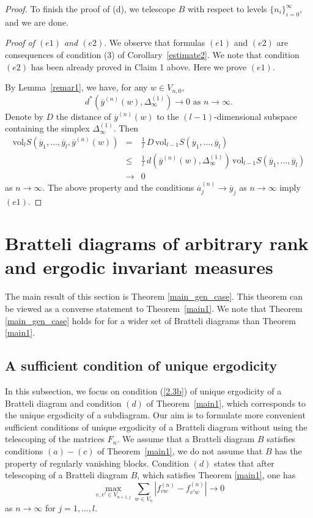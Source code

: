 \documentclass[11pt, english, reqno]{amsart}
\theoremstyle{definition}
\theoremstyle{remark}
\theoremstyle{plain}
\def\ov{\overline}
\numberwithin{equation}{section}
\begin{document}
{\begin{proof}
\medskip
To finish the proof of (d), we  telescope $B$ with respect to levels
$\{n_i\}_{i = 0}^{\infty}$, and we are done.
\medskip

\textit{Proof of  $(e1)$ and  $(e2)$}. We observe that formulas $(e1)$ and $(e2)$
are  consequences of
 condition (3) of Corollary~\ref{estimate2}. We note that condition $(e2)$
has  been already proved in Claim 1 above.
Here we prove $(e1)$.

By Lemma~\ref{remar1},  we have, for any $w \in V_{n,0}$,
$$
d^*(\ov y^{(n)}(w), \Delta_\infty^{(1)}) \rightarrow 0 \mbox{ as }
n \rightarrow \infty.
$$
Denote by $D$ the distance of $\ov y^{(n)}(w)$ to the $(l-1)$-dimensional
subspace  containing the simplex $\Delta_\infty^{(1)}$. Then
\begin{eqnarray*}
\mathrm{vol}_l S(\ov y_1,\ldots, \ov y_l, \ov y^{(n)}(w)) &=& \frac{1}{l} \, D \, \mathrm{vol}_{l-1} S(\ov y_1,\ldots, \ov y_l)\\
 &\leq& \frac{1}{l} \, d(\ov y^{(n)}(w), \Delta_\infty^{(1)}) \, \mathrm{vol}_{l-1} S(\ov y_1,\ldots, \ov y_l)\\
  &\rightarrow& 0
\end{eqnarray*}
as $n \rightarrow \infty$.
The above property and the conditions $\ov a_j^{(n)} \rightarrow \ov y_j$ as $n \rightarrow \infty$ imply $(e1)$.
 \end{proof}

\section{Bratteli diagrams of arbitrary rank and ergodic invariant
 measures} \label{sect 5}
The main result of this section is Theorem \ref{main_gen_case}. This
theorem
can be viewed as a converse statement to Theorem~\ref{main1}. We note
that Theorem \ref{main_gen_case} holds for for a wider set of Bratteli
 diagrams than Theorem \ref{main1}.

\subsection{A sufficient condition of unique ergodicity}

In this subsection, we focus on condition (\ref{2.3b}) of unique ergodicity of a Bratteli diagram and condition $(d)$ of Theorem~\ref{main1}, which corresponds to the unique ergodicity of a subdiagram. Our aim is to formulate more convenient sufficient conditions of unique ergodicity of a Bratteli diagram without using the telescoping of the matrices $F_n$. 
We assume that a Bratteli diagram $B$ satisfies conditions $(a) - (c)$ of Theorem~\ref{main1}, we do not assume that $B$ has the property of regularly vanishing blocks.  
Condition $(d)$ states that after telescoping of a Bratteli diagram $B$, which
satisfies  Theorem  \ref{main1}, one has
$$
\max_{v,v' \in V_{n+1,j}} \sum_{w \in V_{n}} \left|f_{vw}^{(n)} -
f_{v'w}^{(n)}\right| \rightarrow 0
$$
as $n \rightarrow \infty$ for $j = 1,\ldots,l$.

}
\end{document}
